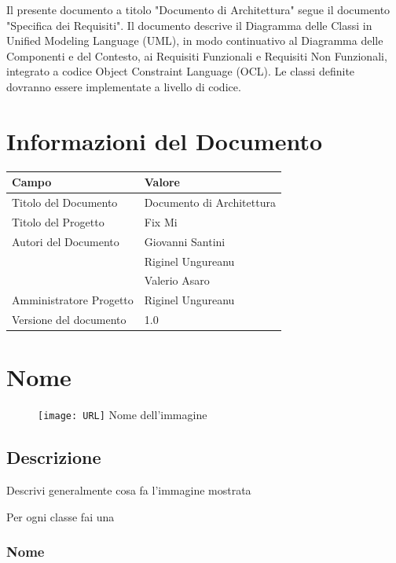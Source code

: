 \documentclass{report}
\begin{document}
	Il presente documento a titolo "Documento di Architettura" segue il documento "Specifica dei Requisiti". Il documento descrive il Diagramma delle Classi in Unified Modeling Language (UML), in modo continuativo al Diagramma delle Componenti e del Contesto, ai Requisiti Funzionali e Requisiti Non Funzionali, integrato a codice Object Constraint Language (OCL). Le classi definite dovranno essere implementate a livello di codice.
	
	
	\section{Informazioni del Documento}
	
	\begin{center} %
		\centering
		\begin{tabular}{ |p{4cm}|p{4cm}|  }
			\hline
			\centering Campo & \qquad\qquad Valore \\ %
			\hline
			Titolo del Documento & Documento di Architettura \\
			\hline
			Titolo del Progetto & Fix Mi \\
			\hline
			Autori del Documento &
			Giovanni Santini \\ & Riginel Ungureanu \\ & Valerio Asaro \\
			\hline
			Amministratore Progetto & Riginel Ungureanu\\
			\hline
			Versione del documento & 1.0 \\
			\hline
		\end{tabular}
	\end{center}
	


\iffalse
\section{Nome}
\begin{figure}[H]
	\centering\texttt{[image: URL]}
	Nome dell'immagine
\end{figure}
\subsection*{Descrizione}
Descrivi generalmente cosa fa l'immagine mostrata

Per ogni classe fai una
\subsubsection{Nome}
\end{document}
